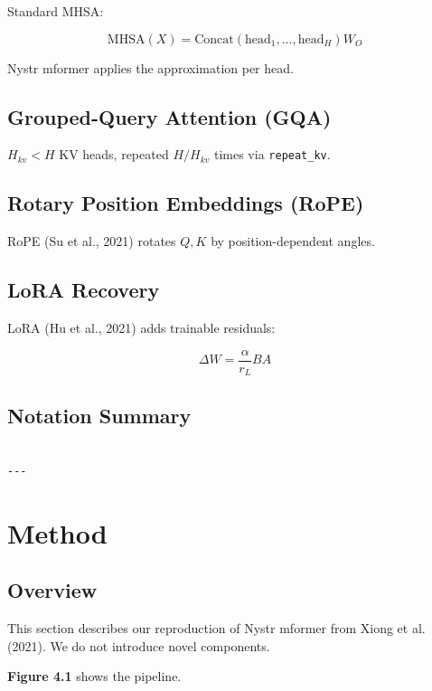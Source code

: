 Standard MHSA:

\[
\text{MHSA}(X) = \mathrm{Concat}(\text{head}_1, \dots, \text{head}_H) W_O
\tag{3.9}
\]

Nystr mformer applies the approximation per head.

\subsection{Grouped-Query Attention (GQA)}

$H_{kv} < H$ KV heads, repeated $H / H_{kv}$ times via \texttt{repeat\_kv}.

\subsection{Rotary Position Embeddings (RoPE)}

RoPE (Su et al., 2021) rotates $Q, K$ by position-dependent angles.

\subsection{LoRA Recovery}

LoRA (Hu et al., 2021) adds trainable residuals:

\[
\Delta W = \frac{\alpha}{r_L} B A
\tag{3.10}
\]

\subsection{Notation Summary}

\begin{lstlisting}

---
\end{lstlisting}


\section{Method}

\subsection{Overview}

This section describes our reproduction of Nystr mformer from Xiong et al. 
(2021). We do not introduce novel components.

\textbf{Figure 4.1} shows the pipeline.

